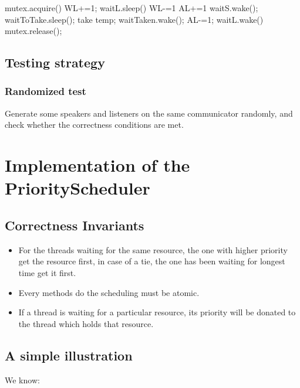 \documentclass{article}
\begin{document}
	\begin{algorithm}[H]
		\begin{algorithmic}
				\State mutex.acquire()
				\State WL+=1;
				\State waitL.sleep()
				\State WL-=1
			\EndWhile
			\State AL+=1
			\If{WS $>$ 0}
				\State waitS.wake();
			\EndIf
			\State waitToTake.sleep();
			\State take temp;
			\State waitTaken.wake();
			\State AL-=1;
				\State waitL.wake()
			\EndIf
			\State mutex.release();
			\EndProcedure
		\end{algorithmic}
	\end{algorithm}
	
	\subsection{Testing strategy}
	
	\subsubsection*{Randomized test}
	Generate some speakers and listeners on the same communicator randomly, and check whether the correctness conditions are met.
%	
	\section{Implementation of the PriorityScheduler}
	
	\subsection{Correctness Invariants}
	
	\begin{itemize}
		\item For the threads waiting for the same resource, the one with higher priority get the resource first, in case of a tie, the one has been waiting for longest time get it first.
		
		\item Every methods do the scheduling must be atomic.
		
		\item If a thread is waiting for a particular resource, its priority will be donated to the thread which holds that resource.
	\end{itemize}
	
	\subsection{A simple illustration}
	We know:
	
\end{document}
